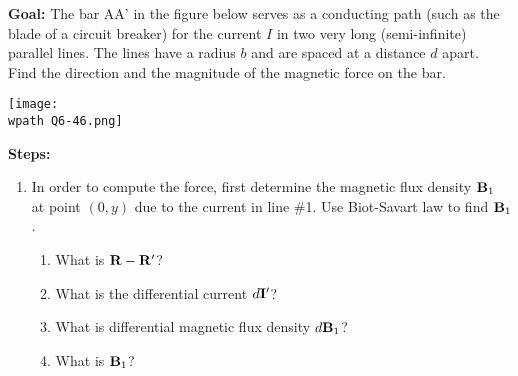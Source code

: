 \documentclass[../../header.tex]{subfiles}
\begin{document}
\textbf{Goal:} The bar AA' in the figure below serves as a conducting path (such as the blade of a circuit breaker) for the current $I$ in two very long (semi-infinite) parallel lines. The lines have a radius $b$ and are spaced at a distance $d$ apart. Find the direction and the magnitude of the magnetic force on the bar.
\begin{center}
\texttt{[image: \\wpath Q6-46.png]}
\end{center}
\textbf{Steps:} 
\begin{enumerate}
\item In order to compute the force, first determine the magnetic flux density $\mathbf{B}_{1}$  at point $(0,y)$ due to the current in line \#1. Use Biot-Savart law to find $\mathbf{B}_1$.
\begin{enumerate}
\item What is $\mathbf{R} - \mathbf{R}'$?


\item What is the differential current $d\mathbf{I}'$?


\item What is differential magnetic flux density $d\mathbf{B}_1$?


\item What is $\mathbf{B}_1$?

\end{enumerate}


\end{enumerate}
\end{document}
